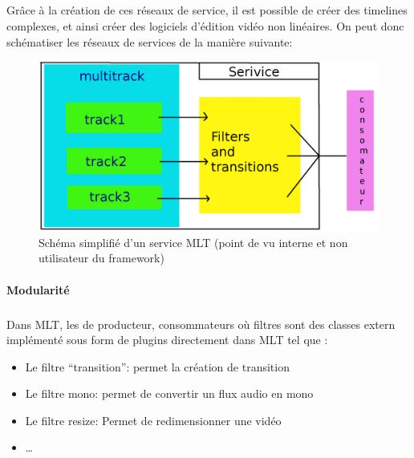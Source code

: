 \subparagraph{}

Grâce à la création de ces réseaux de service, il est possible de
créer des timelines complexes, et ainsi créer des logiciels d'édition
vidéo non linéaires. On peut donc schématiser les réseaux de services
de la manière suivante:

\begin{figure} [H]

  \begin{center}

    \includegraphics[width=1.0\textwidth]{images/service}

  \end{center}

  \caption{Schéma simplifié d'un service MLT (point de vu interne et
    non utilisateur du framework)}

  \label{Yes}

\end{figure}

\paragraph{Modularité}

\subparagraph{}

Dans MLT, les de producteur, consommateurs où filtres sont des classes
extern implémenté sous form de plugins%
directement dans MLT tel que :

\begin{itemize}

  \item {Le filtre ``transition'': permet la création de transition}

  \item {Le filtre mono: permet de convertir un flux audio en mono}

  \item {Le filtre resize: Permet de redimensionner une vidéo}

  \item {\ldots}

\end{itemize}

